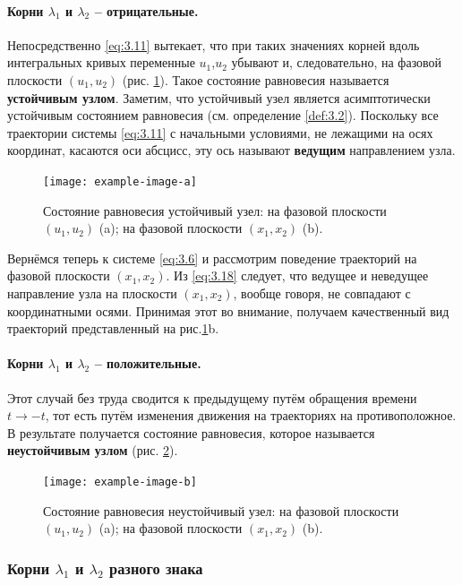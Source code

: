 \paragraph{Корни $\lambda_1$ и $\lambda_2$ -- отрицательные.}%
\label{par:korni_lambda_1_i_lambda_2_otritsatel_nye_}

Непосредственно \eqref{eq:3.11} вытекает, что при таких значениях корней вдоль интегральных кривых переменные $u_1$,$u_2$ убывают и, следовательно, на фазовой плоскости $(u_1,u_2)$ (рис. \ref{fig:3.3}). Такое состояние равновесия называется \textbf{ устойчивым узлом}. Заметим, что устойчивый узел является асимптотически устойчивым состоянием равновесия (см. определение \ref{def:3.2}). Поскольку все траектории системы \eqref{eq:3.11} с начальными условиями, не лежащими на осях координат, касаются оси абсцисс, эту ось называют \textbf{ ведущим} направлением узла.
\begin{figure}[h!]
        \centering
        \texttt{[image: example-image-a]}
        \caption{Состояние равновесия устойчивый узел: на фазовой плоскости $( u_1,u_2)$ (a); на фазовой плоскости $(x_1,x_2)$ (b).}
        \label{fig:3.3}
\end{figure}
Вернёмся теперь к системе \eqref{eq:3.6} и рассмотрим поведение траекторий на фазовой плоскости $(x_1,x_2)$. Из \eqref{eq:3.18} следует, что ведущее и неведущее направление узла на плоскости $(x_1,x_2)$, вообще говоря, не совпадают с координатными осями. Принимая этот во внимание, получаем качественный вид траекторий представленный на рис.\ref{fig:3.3}b.

\paragraph{Корни $\lambda_1$ и $\lambda_2$ -- положительные.}%
\label{par:korni_lambda_1_i_lambda_2_polozhitel_nye_}

Этот случай без труда сводится к предыдущему путём обращения времени $t \to - t$, тот есть путём изменения движения на траекториях на противоположное. В результате получается состояние равновесия, которое называется 
\textbf{ неустойчивым узлом} (рис. \ref{fig:3.4}). 
\begin{figure}[h!]
        \centering
        \texttt{[image: example-image-b]}
        \caption{Состояние равновесия неустойчивый узел: на фазовой плоскости $(u_1,u_2)$ (a); на фазовой плоскости $(x_1,x_2)$ (b).}
        \label{fig:3.4}
\end{figure}
\subsubsection{Корни $\lambda_1$ и $\lambda_2$ разного знака}%
\label{ssub:korni_lambda_1_i_lambda_2_raznogo_znaka}

